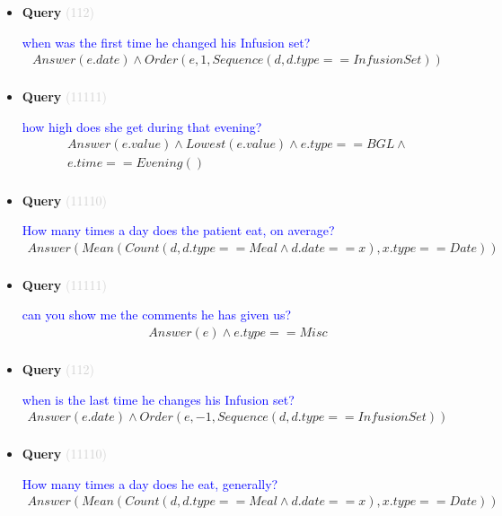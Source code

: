 \documentclass[11pt]{article}
\newcommand{\key}[1]{\textcolor{lightgray}{#1}}
\newcounter{CQuery}
\begin{document}
\begin{itemize}
\item
\textbf{Query\theCQuery} \key{(112)} \addtocounter{CQuery}{1}
\textcolor{blue}{ when was the first time he changed his Infusion set? }
\begin{multline*}
Answer(e.date) \wedge Order(e, 1, Sequence(d, d.type==InfusionSet)) \\ 
\end{multline*}


\item
\textbf{Query\theCQuery} \key{(11111)} \addtocounter{CQuery}{1}
\textcolor{blue}{ how high does she get during that evening? }
\begin{multline*}
Answer(e.value) \wedge Lowest(e.value) \wedge e.type==BGL \wedge \\ 
e.time==Evening() \\ 
\end{multline*}


\item
\textbf{Query\theCQuery} \key{(11110)} \addtocounter{CQuery}{1}
\textcolor{blue}{ How many times a day does the patient eat, on average? }
\begin{multline*}
Answer(Mean(Count(d, d.type==Meal \wedge d.date==x), x.type==Date)) \\ 
\end{multline*}


\item
\textbf{Query\theCQuery} \key{(11111)} \addtocounter{CQuery}{1}
\textcolor{blue}{ can you show me the comments he has given us? }
\begin{multline*}
Answer(e) \wedge e.type==Misc \\ 
\end{multline*}


\item
\textbf{Query\theCQuery} \key{(112)} \addtocounter{CQuery}{1}
\textcolor{blue}{ when is the last time he changes his Infusion set? }
\begin{multline*}
Answer(e.date) \wedge Order(e, -1, Sequence(d, d.type==InfusionSet)) \\ 
\end{multline*}


\item
\textbf{Query\theCQuery} \key{(11110)} \addtocounter{CQuery}{1}
\textcolor{blue}{ How many times a day does he eat, generally? }
\begin{multline*}
Answer(Mean(Count(d, d.type==Meal \wedge d.date==x), x.type==Date)) \\ 
\end{multline*}



\end{itemize}
\end{document}
